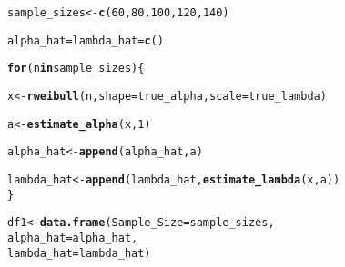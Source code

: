 \documentclass[11pt, a4paper]{article}\usepackage[]{graphicx}\usepackage[]{xcolor}
\makeatletter
\newcommand{\hlnum}[1]{\textcolor[rgb]{0.686,0.059,0.569}{#1}}%
\newcommand{\hldef}[1]{\textcolor[rgb]{0.345,0.345,0.345}{#1}}%
\newcommand{\hlkwa}[1]{\textcolor[rgb]{0.161,0.373,0.58}{\textbf{#1}}}%
\newcommand{\hlkwb}[1]{\textcolor[rgb]{0.69,0.353,0.396}{#1}}%
\newcommand{\hlkwc}[1]{\textcolor[rgb]{0.333,0.667,0.333}{#1}}%
\newcommand{\hlkwd}[1]{\textcolor[rgb]{0.737,0.353,0.396}{\textbf{#1}}}%
\newenvironment{kframe}{%
 \def\at@end@of@kframe{}%
 \ifinner\ifhmode%
  \def\at@end@of@kframe{\end{minipage}}%
  \begin{minipage}{\columnwidth}%
 \fi\fi%
 \def\FrameCommand##1{\hskip\@totalleftmargin \hskip-\fboxsep
 \colorbox{shadecolor}{##1}\hskip-\fboxsep
     \hskip-\linewidth \hskip-\@totalleftmargin \hskip\columnwidth}%
 \MakeFramed {\advance\hsize-\width
   \@totalleftmargin\z@ \linewidth\hsize
   \@setminipage}}%
 {\par\unskip\endMakeFramed%
 \at@end@of@kframe}
\newenvironment{knitrout}{}{} %
\makeatother
\begin{document}
\begin{knitrout}
\color{fgcolor}\begin{kframe}
\begin{alltt}
\hldef{sample_sizes} \hlkwb{<-} \hlkwd{c}\hldef{(}\hlnum{60}\hldef{,} \hlnum{80}\hldef{,} \hlnum{100}\hldef{,} \hlnum{120}\hldef{,} \hlnum{140}\hldef{)}
\end{alltt}
\end{kframe}
\end{knitrout}

\begin{knitrout}
\color{fgcolor}\begin{kframe}
\begin{alltt}
\hldef{alpha_hat} \hlkwb{=} \hldef{lambda_hat} \hlkwb{=} \hlkwd{c}\hldef{()}
\end{alltt}
\end{kframe}
\end{knitrout}

\begin{knitrout}
\color{fgcolor}\begin{kframe}
\begin{alltt}
\hlkwa{for} \hldef{(n} \hlkwa{in} \hldef{sample_sizes) \{}

  \hldef{x} \hlkwb{<-} \hlkwd{rweibull}\hldef{(n,} \hlkwc{shape} \hldef{= true_alpha,} \hlkwc{scale} \hldef{= true_lambda)}

  \hldef{a} \hlkwb{<-} \hlkwd{estimate_alpha}\hldef{(x,} \hlnum{1}\hldef{)}

  \hldef{alpha_hat} \hlkwb{<-} \hlkwd{append}\hldef{(alpha_hat, a)}

  \hldef{lambda_hat} \hlkwb{<-} \hlkwd{append}\hldef{(lambda_hat,} \hlkwd{estimate_lambda}\hldef{(x, a))}
\hldef{\}}
\end{alltt}
\end{kframe}
\end{knitrout}

\begin{knitrout}
\color{fgcolor}\begin{kframe}
\begin{alltt}
\hldef{df1} \hlkwb{<-} \hlkwd{data.frame}\hldef{(}\hlkwc{Sample_Size} \hldef{= sample_sizes,}
                  \hlkwc{alpha_hat} \hldef{= alpha_hat,}
                  \hlkwc{lambda_hat} \hldef{= lambda_hat)}
\end{alltt}
\end{kframe}
\end{knitrout}
\end{document}
